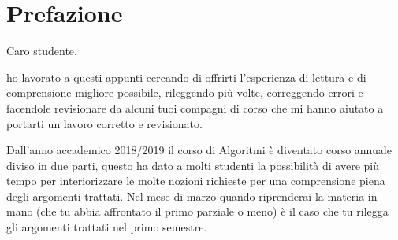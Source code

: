 \chapter*{Prefazione}

Caro studente,

ho lavorato a questi appunti cercando di offrirti l'esperienza di lettura e di comprensione migliore possibile, rileggendo più volte, correggendo errori e facendole revisionare da alcuni tuoi compagni di corso che mi hanno aiutato a portarti un lavoro corretto e revisionato.



Dall'anno accademico 2018/2019 il corso di Algoritmi è diventato corso annuale diviso in due parti, questo ha dato a molti studenti la possibilità di avere più tempo per interiorizzare le molte nozioni richieste per una comprensione piena degli argomenti trattati.
Nel mese di marzo quando riprenderai la materia in mano (che tu abbia affrontato il primo parziale o meno) è il caso che tu rilegga gli argomenti trattati nel primo semestre.

